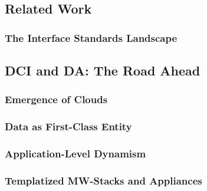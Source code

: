 \documentclass[a4paper,12pt]{article}
\begin{document}
\subsection{Related Work}

\subsubsection{The Interface Standards Landscape}\label{interface_landscape}

\subsection{DCI and DA: The Road Ahead}

\subsubsection{Emergence of Clouds}

\subsubsection{Data as First-Class Entity}

\subsubsection{Application-Level Dynamism}

\subsubsection{Templatized MW-Stacks and Appliances}

 

\end{document}
